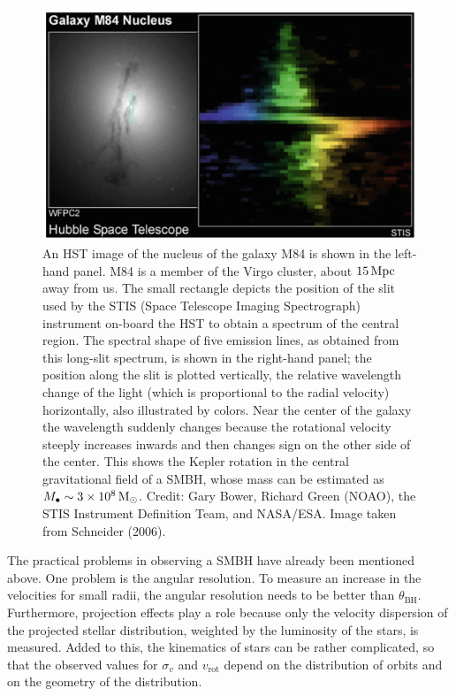 \documentclass[a4paper,11pt]{article}
\begin{document}
\begin{figure}[t]
    \centering
    \includegraphics[width=16cm]{figures/M84HST.png}
    \caption{\footnotesize{An HST image of the nucleus of the galaxy M84 is shown in the left-hand panel. M84 is a member of the Virgo cluster, about $15\,{\rm Mpc}$ away from us. The small rectangle depicts the position of the slit used by the STIS (Space Telescope Imaging Spectrograph) instrument on-board the HST to obtain a spectrum of the central region. The spectral shape of five emission lines, as obtained from this long-slit spectrum, is shown in the right-hand panel; the position along the slit is plotted vertically, the relative wavelength change of the light (which is proportional to the radial velocity) horizontally, also illustrated by colors. Near the center of the galaxy the wavelength suddenly changes because the rotational velocity steeply increases inwards and then changes sign on the other side of the center. This shows the Kepler rotation in the central gravitational field of a SMBH, whose mass can be estimated as $M_\bullet \sim 3\times10^8\,{\rm M_\odot}$. Credit: Gary Bower, Richard Green (NOAO), the STIS Instrument Definition Team, and NASA/ESA. Image taken from Schneider (2006).}}
    \label{fig:m84hst}
\end{figure}

{\noindent}The practical problems in observing a SMBH have already been mentioned above. One problem is the angular resolution. To measure an increase in the velocities for small radii, the angular resolution needs to be better than $\theta_\mathrm{BH}$. Furthermore, projection effects play a role because only the velocity dispersion of the projected stellar distribution, weighted by the luminosity of the stars, is measured. Added to this, the kinematics of stars can be rather complicated, so that the observed values for $\sigma_v$ and $v_\mathrm{rot}$ depend on the distribution of orbits and on the geometry of the distribution.
\end{document}
